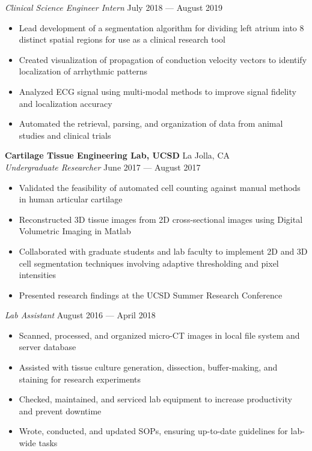 \documentclass{article}
\begin{document}
\textit{Clinical Science Engineer Intern} \hfill July 2018 --- August 2019\\
\vspace{-2mm}
\begin{itemize} \itemsep 0.05pt
	\item Lead development of a segmentation algorithm for dividing left atrium into 8 distinct spatial regions for use as a clinical research tool
	\item Created visualization of propagation of conduction velocity vectors to identify localization of arrhythmic patterns
	\item Analyzed ECG signal using multi-modal methods to improve signal fidelity and localization accuracy
	\item Automated the retrieval, parsing, and organization of data from animal studies and clinical trials
\end{itemize}


\textbf{Cartilage Tissue Engineering Lab, UCSD} \hfill La Jolla, CA\\
\textit{Undergraduate Researcher} \hfill June 2017 --- August 2017\\
\vspace{-2mm}
\begin{itemize} \itemsep 0.05pt
	\item Validated the feasibility of automated cell counting against manual methods in human articular cartilage
	\item Reconstructed 3D tissue images from 2D cross-sectional images using Digital Volumetric Imaging in Matlab
	\item Collaborated with graduate students and lab faculty to implement 2D and 3D cell segmentation techniques involving adaptive thresholding and pixel intensities
	\item Presented research findings at the UCSD Summer Research Conference
\end{itemize}


\textit{Lab Assistant} \hfill August 2016 --- April 2018\\
\vspace{-2mm}
\begin{itemize} \itemsep 0.05pt
	\item Scanned, processed, and organized micro-CT images in local file system and server database
	\item Assisted with tissue culture generation, dissection, buffer-making, and staining for research experiments
	\item Checked, maintained, and serviced lab equipment to increase productivity and prevent downtime
	\item Wrote, conducted, and updated SOPs, ensuring up-to-date guidelines for lab-wide tasks
\end{itemize}
\end{document}

